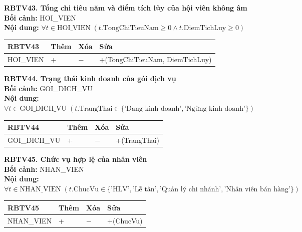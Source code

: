 \documentclass[11pt, a4paper]{article}
\begin{document}
\vspace{0.8em}
\textbf{RBTV43. Tổng chi tiêu năm và điểm tích lũy của hội viên không âm} \\
\textbf{Bối cảnh:} HOI\_VIEN \\
\textbf{Nội dung:} $\forall t \in \text{HOI\_VIEN} \; (t.\text{TongChiTieuNam} \ge 0 \land t.\text{DiemTichLuy} \ge 0)$

\vspace{0.3em}
\begin{small}
\begin{tabularx}{\textwidth}{| C{4.2cm} | C{2cm} | C{2cm} | Y |}
\hline
\textbf{RBTV43} & \textbf{Thêm} & \textbf{Xóa} & \textbf{Sửa} \\
\hline
HOI\_VIEN & + & $-$ & +(TongChiTieuNam, DiemTichLuy) \\
\hline
\end{tabularx}
\end{small}

\vspace{0.8em}
\textbf{RBTV44. Trạng thái kinh doanh của gói dịch vụ} \\
\textbf{Bối cảnh:} GOI\_DICH\_VU \\
\textbf{Nội dung:} $\forall t \in \text{GOI\_DICH\_VU} \; (t.\text{TrangThai} \in \{\text{'Đang kinh doanh'}, \text{'Ngừng kinh doanh'}\})$

\vspace{0.3em}
\begin{small}
\begin{tabularx}{\textwidth}{| C{4.2cm} | C{2cm} | C{2cm} | Y |}
\hline
\textbf{RBTV44} & \textbf{Thêm} & \textbf{Xóa} & \textbf{Sửa} \\
\hline
GOI\_DICH\_VU & + & $-$ & +(TrangThai) \\
\hline
\end{tabularx}
\end{small}

\vspace{0.8em}
\textbf{RBTV45. Chức vụ hợp lệ của nhân viên} \\
\textbf{Bối cảnh:} NHAN\_VIEN \\
\textbf{Nội dung:} $\forall t \in \text{NHAN\_VIEN} \; (t.\text{ChucVu} \in \{\text{'HLV'}, \text{'Lễ tân'}, \text{'Quản lý chi nhánh'}, \text{'Nhân viên bán hàng'}\})$

\vspace{0.3em}
\begin{small}
\begin{tabularx}{\textwidth}{| C{4.2cm} | C{2cm} | C{2cm} | Y |}
\hline
\textbf{RBTV45} & \textbf{Thêm} & \textbf{Xóa} & \textbf{Sửa} \\
\hline
NHAN\_VIEN & + & $-$ & +(ChucVu) \\
\hline
\end{tabularx}
\end{small}
\end{document}
